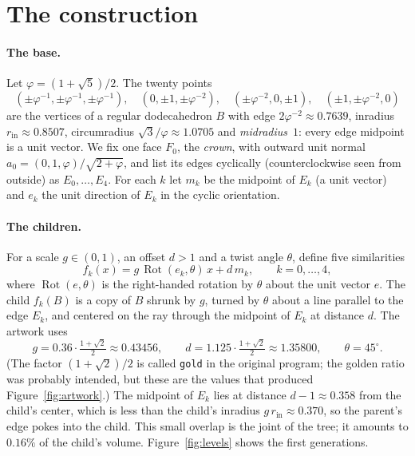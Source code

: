 \documentclass[12pt]{article}
\theoremstyle{plain}
\theoremstyle{remark}
\newcommand{\Rot}{\operatorname{Rot}}
\begin{document}
\section{The construction}\label{sec:construction}

\paragraph{The base.}  Let $\varphi=(1+\sqrt5)/2$.  The twenty points
\[
  (\pm\varphi^{-1},\pm\varphi^{-1},\pm\varphi^{-1}),\quad
  (0,\pm1,\pm\varphi^{-2}),\quad(\pm\varphi^{-2},0,\pm1),\quad(\pm1,\pm\varphi^{-2},0)
\]
are the vertices of a regular dodecahedron $B$ with edge $2\varphi^{-2}\approx
0.7639$, inradius $r_{\mathrm{in}}\approx0.8507$, circumradius
$\sqrt3/\varphi\approx1.0705$ and \emph{midradius}~$1$: every edge midpoint is
a unit vector.  We fix one face $F_0$, the \emph{crown}, with outward unit
normal $a_0=(0,1,\varphi)/\sqrt{2+\varphi}$, and list its edges cyclically
(counterclockwise seen from outside) as $E_0,\dots,E_4$.  For each $k$ let
$m_k$ be the midpoint of $E_k$ (a unit vector) and $e_k$ the unit direction of
$E_k$ in the cyclic orientation.

\paragraph{The children.}  For a scale $g\in(0,1)$, an offset $d>1$ and a twist
angle $\theta$, define five similarities
\begin{equation}\label{eq:maps}
  f_k(x) = g\,\Rot(e_k,\theta)\,x + d\,m_k,\qquad k=0,\dots,4,
\end{equation}
where $\Rot(e,\theta)$ is the right-handed rotation by $\theta$ about the unit
vector $e$.  The child $f_k(B)$ is a copy of $B$ shrunk by $g$, turned by
$\theta$ about a line parallel to the edge $E_k$, and centered on the ray
through the midpoint of $E_k$ at distance $d$.  The artwork uses
\begin{equation}\label{eq:params}
  g = 0.36\cdot\tfrac{1+\sqrt2}{2}\approx 0.43456,\qquad
  d = 1.125\cdot\tfrac{1+\sqrt2}{2}\approx 1.35800,\qquad
  \theta = 45^\circ .
\end{equation}
(The factor $(1+\sqrt2)/2$ is called \texttt{gold} in the original program; the
golden ratio was probably intended, but these are the values that produced
Figure~\ref{fig:artwork}.)  The midpoint of $E_k$ lies at distance
$d-1\approx0.358$ from the child's center, which is less than the child's
inradius $g\,r_{\mathrm{in}}\approx0.370$, so the parent's edge pokes into the
child.  This small overlap is the joint of the tree; it amounts to $0.16\%$ of
the child's volume.  Figure~\ref{fig:levels} shows the first generations.
\end{document}
